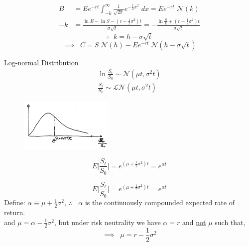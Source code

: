 \documentclass[
14pt,notheorems,hyperref={pdfauthor=whatever}
]{beamer}
\begin{document}
\begin{frame}
\begin{align*}
    B &= E e^{-rt} \int_{-k}^\infty \frac{1}{\sqrt{2\pi}} e^{-\frac{1}{2} x^2}\;dx = E e^{-rt}\;\mathcal{N}(k)\\
    -k &= \frac{\ln E - \ln S - (r-\frac{1}{2}\sigma^2)t}{\sigma\sqrt{t}} = - \frac{\ln{\frac{S}{E}}+(r-\frac{1}{2}\sigma^2)t}{\sigma\sqrt{t}} 
\end{align*}
\[ \therefore \;\; k = h-\sigma\sqrt{t} \] 
\[ \implies \;\; C = S\;\mathcal{N}(h) -E e^{-rt}\;\mathcal{N}(h-\sigma\sqrt{t})\]
\end{frame}

\begin{frame}
\underline{Log-normal Distribution}\\
\begin{align*}
    \ln{\frac{S_t}{S_0}} \sim \mathcal{N}(\mu t, \sigma^2 t)\\
    \frac{S_t}{S_0} \sim \mathcal{LN}(\mu t, \sigma^2 t)
\end{align*}
\begin{figure}[lognormal]
    \includegraphics[width=0.4\textwidth]{images/L16-lognormal.png}
    \centering
\end{figure}
\[ E \bigg[ \frac{S_t}{S_0} \bigg] = e^{(\mu +\frac{1}{2} \sigma^2)t} = e^{\alpha t}\]
\end{frame}

\begin{frame}
\[ E \bigg[ \frac{S_t}{S_0} \bigg] = e^{(\mu +\frac{1}{2} \sigma^2)t} = e^{\alpha t}\]
Define: $\alpha \equiv \mu + \frac{1}{2}\sigma^2$,
$\therefore \;\;$ $\alpha$ is the continuously compounded expected rate of return.\\
\hfill\break
and $\mu = \alpha - \frac{1}{2}\sigma^2$, but under risk neutrality we have $\alpha=r$ and \underline{not} $\mu$ such that,
\[ \implies \;\; \mu = r-\frac{1}{2}\sigma^2 \]
\end{frame}
\end{document}
